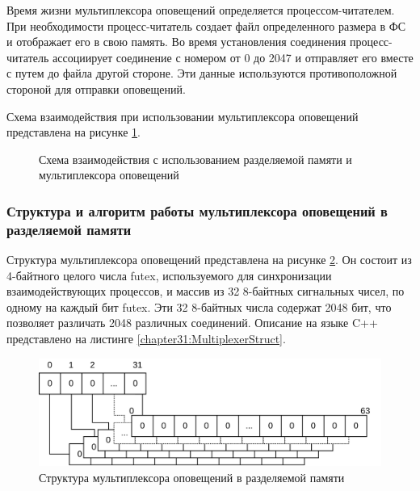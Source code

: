 Время жизни мультиплексора оповещений определяется процессом-читателем. При необходимости процесс-читатель создает файл определенного размера в ФС и отображает его в свою память. Во время установления соединения процесс-читатель ассоциирует соединение с номером от 0 до 2047 и отправляет его вместе с путем до файла другой стороне. Эти данные используются противоположной стороной для отправки оповещений.

Схема взаимодействия при использовании мультиплексора оповещений представлена на рисунке \ref{chapter31:FutexShmemStack}.
\begin{figure}[!h]
\caption{Схема взаимодействия с использованием разделяемой памяти и мультиплексора оповещений}
\label{chapter31:FutexShmemStack}
\end{figure}

\subsubsection{Структура и алгоритм работы мультиплексора оповещений в разделяемой памяти}\label{chapter31:MuxStructure}

Структура мультиплексора оповещений представлена на рисунке \ref{chapter31:MuxZeroState}. Он состоит из 4-байтного целого числа futex, используемого для синхронизации взаимодействующих процессов, и массив из 32 8-байтных сигнальных чисел, по одному на каждый бит futex. Эти 32 8-байтных числа содержат 2048 бит, что позволяет различать 2048 различных соединений. Описание на языке C++ представлено на листинге \ref{chapter31:MultiplexerStruct}.


\begin{figure}[!h]
\caption{Структура мультиплексора оповещений в разделяемой памяти}
\label{chapter31:MuxZeroState}
\includegraphics[width=\textwidth]{../../graphics/schemes/futex}
\end{figure}

